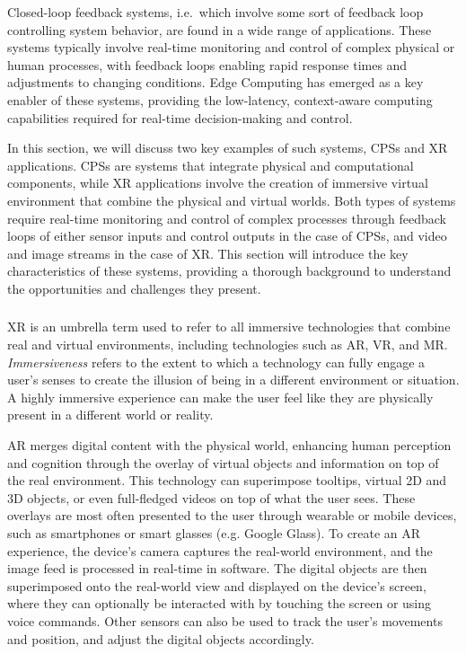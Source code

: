 Closed-loop feedback systems, i.e.\ which involve some sort of feedback loop controlling system behavior, are found in a wide range of applications.
These systems typically involve real-time monitoring and control of complex physical or human processes, with feedback loops enabling rapid response times and adjustments to changing conditions.
Edge Computing has emerged as a key enabler of these systems, providing the low-latency, context-aware computing capabilities required for real-time decision-making and control.

In this section, we will discuss two key examples of such systems, \glspl{CPS} and \gls{XR} applications.
\glspl{CPS} are systems that integrate physical and computational components, while \gls{XR} applications involve the creation of immersive virtual environment that combine the physical and virtual worlds.
Both types of systems require real-time monitoring and control of complex processes through feedback loops of either sensor inputs and control outputs in the case of \glspl{CPS}, and video and image streams in the case of \gls{XR}.
This section will introduce the key characteristics of these systems, providing a thorough background to understand the opportunities and challenges they present.

\subsubsection{}\label{background:xr}

\gls{XR} is an umbrella term used to refer to all immersive technologies that combine real and virtual environments, including technologies such as \gls{AR}, \gls{VR}, and \gls{MR}.
\emph{Immersiveness} refers to the extent to which a technology can fully engage a user's senses to create the illusion of being in a different environment or situation.
A highly immersive experience can make the user feel like they are physically present in a different world or reality.

\gls{AR} merges digital content with the physical world, enhancing human perception and cognition through the overlay of virtual objects and information on top of the real environment.
This technology can superimpose tooltips, virtual \gls{2D} and \gls{3D} objects, or even full-fledged videos on top of what the user sees.
These overlays are most often presented to the user through wearable or mobile devices, such as smartphones or smart glasses (e.g. Google Glass).
To create an \gls{AR} experience, the device's camera captures the real-world environment, and the image feed is processed in real-time in software.
The digital objects are then superimposed onto the real-world view and displayed on the device's screen, where they can optionally be interacted with by touching the screen or using voice commands.
Other sensors can also be used to track the user's movements and position, and adjust the digital objects accordingly.

